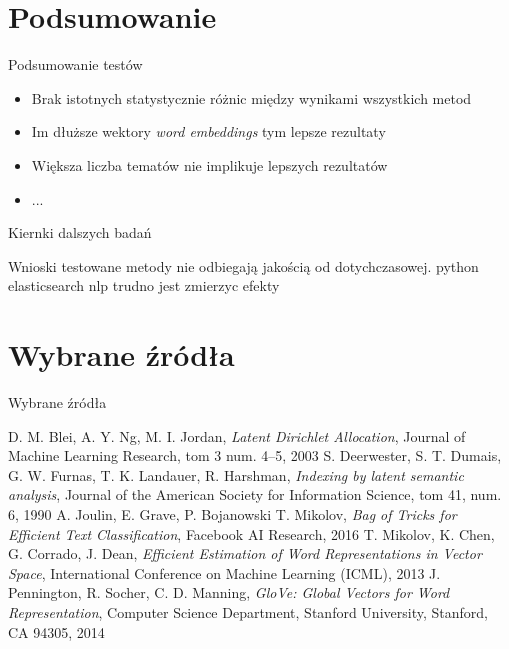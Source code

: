 \documentclass{beamer}
\begin{document}
	\section{Podsumowanie}
	\begin{frame}{Podsumowanie testów}
		\begin{itemize}
			\item Brak istotnych statystycznie różnic między wynikami wszystkich metod \pause
			\item Im dłuższe wektory \emph{word embeddings} tym lepsze rezultaty \pause
			\item Większa liczba tematów nie implikuje lepszych rezultatów \pause
			\item ...
		\end{itemize}
	\end{frame}
	\begin{frame}{Kiernki dalszych badań}
		
	\end{frame}
	\begin{frame}{Wnioski}
		testowane metody nie odbiegają jakością od dotychczasowej.
		python
		elasticsearch
		nlp
		trudno jest zmierzyc efekty
	\end{frame}
	\section{Wybrane źródła}
	\begin{frame}{Wybrane źródła}
		\begin{thebibliography}{30}
				D. M. Blei, A. Y. Ng, M. I. Jordan,
				\emph{Latent Dirichlet Allocation},
				Journal of Machine Learning Research, tom 3 num. 4–5,
				2003
				S. Deerwester, S. T. Dumais, G. W. Furnas, T. K. Landauer, R. Harshman,
				\emph{Indexing by latent semantic analysis},
				Journal of the American Society for Information Science, tom 41, num. 6,
				1990
				A. Joulin, E. Grave, P. Bojanowski T. Mikolov,
				\emph{Bag of Tricks for Efficient Text Classification},
				Facebook AI Research,
				2016
				T. Mikolov, K. Chen, G. Corrado, J. Dean,
				\emph{Efficient Estimation of Word Representations in Vector Space},
				International Conference on Machine Learning (ICML),
				2013
				J. Pennington, R. Socher, C. D. Manning,
				\emph{GloVe: Global Vectors for Word Representation},
				Computer Science Department, Stanford University, Stanford, CA 94305,
				2014
		\end{thebibliography}
	\end{frame}
\end{document}
